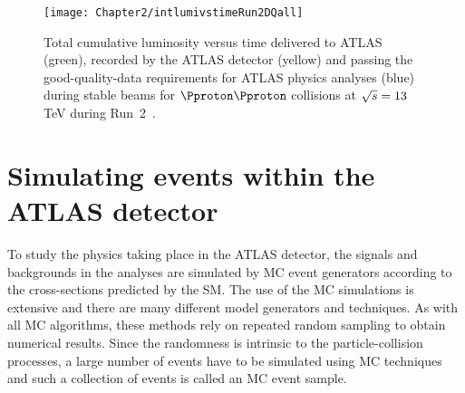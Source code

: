 
\begin{figure}[h]
 	 \centering
 	  \texttt{[image: Chapter2/intlumivstimeRun2DQall]}
	  \caption{Total cumulative luminosity versus time delivered to ATLAS (green), 
	  recorded by the ATLAS detector (yellow) and passing the good-quality-data 
	  requirements for ATLAS physics analyses (blue) during stable beams for 
	  $\Pproton\Pproton$ collisions at $\sqrt{s} = 13$ TeV during Run~2~\cite{ATLAS:2019fst}.}
	\label{fig:Chap2:intlumivstimeRun2DQall}
\end{figure}



\section{Simulating events within the ATLAS detector}
\label{sec:Chap3.1:MC}
To study the physics taking place in the ATLAS detector, the signals and backgrounds in the analyses are
simulated by MC event generators according to the cross-sections predicted by the SM. 
The use of the MC simulations is extensive and there are many different model generators and techniques. As with all
 MC algorithms, these methods rely on repeated random sampling to obtain numerical results. %
Since the randomness is intrinsic to the particle-collision processes, a large number of events 
have to be simulated using MC techniques and such a collection of events is called an MC event sample.

